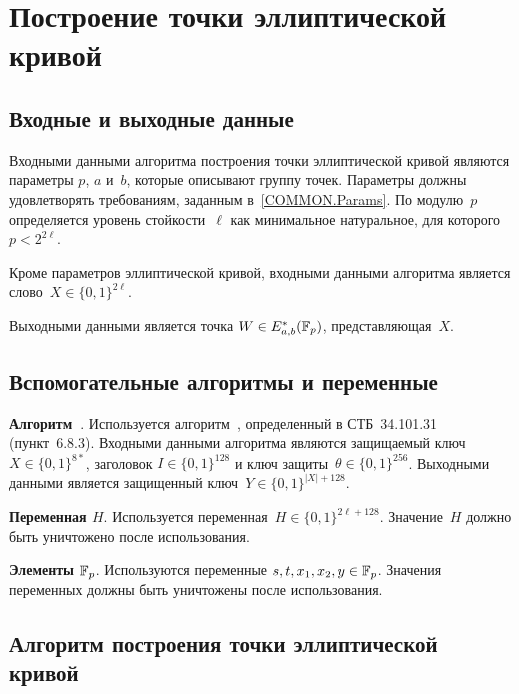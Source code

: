 \section{Построение точки эллиптической кривой}\label{SWU}

\subsection{Входные и выходные данные}

Входными данными алгоритма построения точки эллиптической кривой
являются параметры $p$, $a$ и~$b$, которые описывают группу точек. 
Параметры должны удовлетворять требованиям, 
заданным в~\ref{COMMON.Params}. 
По модулю~$p$ определяется уровень стойкости~$\ell$ как минимальное 
натуральное, для которого~$p<2^{2\ell}$.

Кроме параметров эллиптической кривой,
входными данными алгоритма является слово~$X\in\{0,1\}^{2\ell}$.

Выходными данными является точка $W\in E_{a,b}^*(\mathbb{F}_p)$, 
представляющая~$X$.

\subsection{Вспомогательные алгоритмы и переменные}

{\bf Алгоритм~}.
Используется алгоритм~,
определенный в СТБ~34.101.31 (пункт~6.8.3).
Входными данными алгоритма являются
защищаемый ключ~$X\in\{0,1\}^{8*}$, заголовок $I\in\{0,1\}^{128}$
и ключ защиты~$\theta\in\{0,1\}^{256}$.
Выходными данными является
защищенный ключ~$Y\in\{0,1\}^{|X|+128}$.

{\bf Переменная $H$}.
Используется переменная~$H\in\{0,1\}^{2\ell+128}$.
Значение~$H$ должно быть уничтожено после использования.

{\bf Элементы $\mathbb{F}_p$}.
Используются переменные $s,t,x_1,x_2,y\in\mathbb{F}_p$.
Значения переменных должны быть уничтожены после использования.

\subsection{Алгоритм построения точки эллиптической кривой}\label{SWU.Alg}

